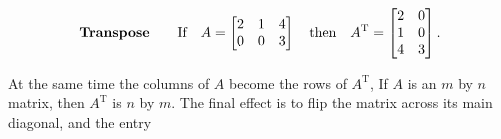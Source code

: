 \[\mbox{\bf Transpose}\qquad\mbox{If}\quad A=\begin{bmatrix}2&1&4\\ 0&0&3\end{bmatrix}\quad\mbox{then}\quad A^{\mathrm{T}}=\begin{bmatrix}2&0\\ 1&0\\ 4&3\end{bmatrix}.\]

At the same time the columns of \(A\) become the rows of \(A^{\mathrm{T}}\), If \(A\) is an \(m\) by \(n\) matrix, then \(A^{\mathrm{T}}\) is \(n\) by \(m\). The final effect is to flip the matrix across its main diagonal, and the entry 